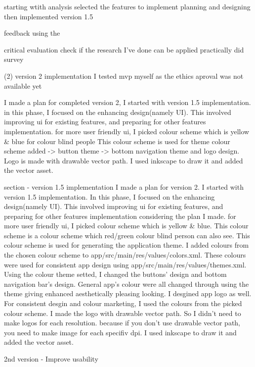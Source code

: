 starting wtith analysis
selected the features to implement 
planning and designing
then implemented version 1.5


feedback using the 


critical evaluation
check if the research I've done can be applied practically
did survey



(2) version 2 implementation
I tested mvp myself as the ethics aproval was not available yet






I made a plan for completed version 2, I started with version 1.5 implementation.
in this phase, I focused on the enhancing design(namely UI). This involved improving ui for existing features, and preparing for other features implementation. 
for more user friendly ui, I picked colour scheme which is yellow & blue for colour blind people
This colour scheme is used for theme {
    colour scheme added
    -> button theme 
    -> bottom navigation theme 
}
and logo design. Logo is made with drawable vector path. I used inkscape to draw it and added the vector asset. 


section - version 1.5 implementation 
I made a plan for version 2.
I started with version 1.5 implementation.
In this phase, I focused on the enhancing design(namely UI). 
This involved improving ui for existing features, 
and preparing for other features implementation considering the plan I made.
for more user friendly ui, 
I picked colour scheme which is yellow & blue.
This colour scheme is a colour scheme which red/green colour blind person can also see.
This colour scheme is used for generating the application theme.  
I added colours from the chosen colour scheme to app/src/main/res/values/colors.xml.
These colours were used for consistent app design using app/src/main/res/values/themes.xml.
Using the colour theme setted, I changed the buttons' design and bottom navigation bar's design.
General app's colour were all changed through using the theme giving enhanced aesthetically pleasing looking.
I desgined app logo as well. For consistent desgin and colour marketing, I used the colours from the picked colour scheme.
I made the logo with drawable vector path. So I didn't need to make logos for each resolution. 
because if you don't use drawable vector path, you need to make image for each specifiv dpi. 
I used inkscape to draw it and added the vector asset. 



2nd version - Improve usability

